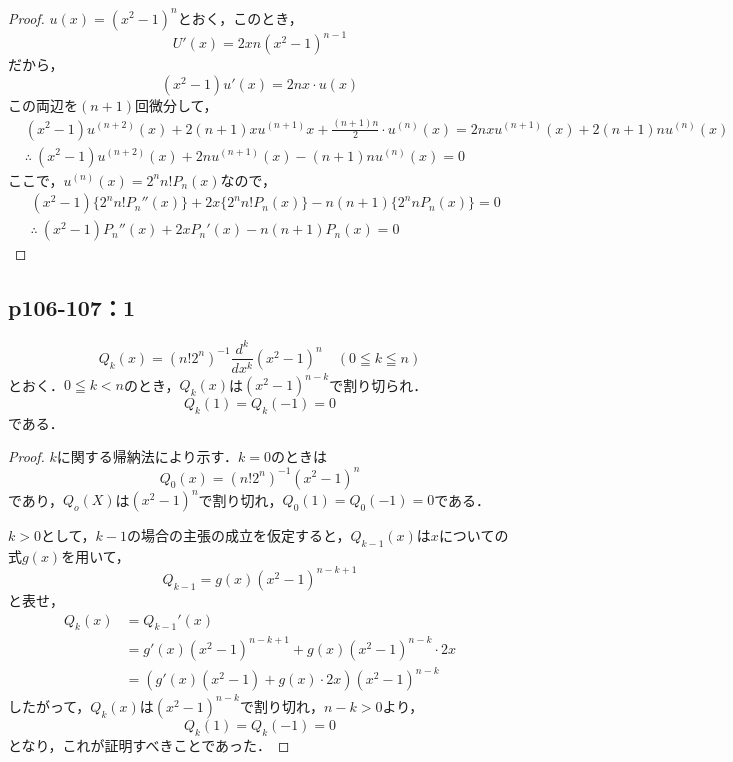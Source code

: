\documentclass[a4paper,10pt,fleqn]{ltjsarticle}
\begin{document}
\begin{tleftbar}
    \begin{proof}
    $u(x)= (x^2-1)^n$とおく，このとき，
    \[
     U'(x)= 2x n(x^2-1)^{n-1}
    \]
    だから，
    \[
        (x^2-1) u'(x)=2nx \cdot u(x)
    \]
    この両辺を$(n+1)$回微分して，
    \begin{align*}
       & (x^2-1)u^{(n+2)}(x)+2(n+1)x u^{(n+1)} x + \frac{(n+1)n}{2} \cdot u^{(n)} (x) = 2nx u^{(n+1)}(x) + 2(n+1) n u^{(n)}(x) \\
       & \therefore ~(x^2-1)u^{(n+2)}(x) + 2n u^{(n+1)}(x)-(n+1)n u^{(n)}(x)=0
    \end{align*}
    ここで，$ u^{(n)} (x)= 2^n n! P_n (x)$なので，
    \begin{align*} 
        & (x^2 -1) \{ 2^n n! P_n ''(x) \} +2x \{ 2^n n! P_n (x) \} -n(n+1) \{ 2^n n P_n(x) \} =0 \\
      &   \therefore ~ (x^2-1) P_n ''(x)+2x P_n '(x) -n(n+1) P_n (x)=0
    \end{align*}
\end{proof}
\end{tleftbar}

\newpage 
\subsection*{p106-107：1}


    \[
        Q_k (x)= (n! 2^n)^{-1} \frac{d^k}{dx^k} (x^2-1)^n \quad (0 \leqq k \leqq n)
    \]
とおく．$0 \leqq k <n$のとき，$Q_k (x)$は$(x^2-1)^{n-k}$で割り切られ．
\[
    Q_k (1)= Q_k(-1)=0
\]
である．

\begin{proof}
    $k$に関する帰納法により示す．$k=0$のときは
    \[
        Q_0(x)= (n! 2^n)^{-1} (x^2-1)^n
    \]
    であり，$Q_o(X)$は$(x^2-1)^n$で割り切れ，$Q_0(1)=Q_0(-1)=0$である．

    $k>0$として，$k-1$の場合の主張の成立を仮定すると，$Q_{k-1}(x)$は$x$についての式$g(x)$を用いて，
    \[
        Q_{k-1} = g(x)(x^2-1)^{n-k+1}
    \]
    と表せ，
    \begin{align*}
        Q_k (x) & =Q_{k-1}' (x) \\
        &= g'(x)(x^2-1)^{n-k+1} + g(x) (x^2-1)^{n-k} \cdot 2x \\
        &=(g'(x)(x^2-1)+g(x) \cdot 2x) (x^2-1)^{n-k}
    \end{align*}
    したがって，$Q_k(x)$は$(x^2-1)^{n-k}$で割り切れ，$n-k >0$より，
    \[
        Q_k (1)= Q_k(-1)=0
    \]
    となり，これが証明すべきことであった．
\end{proof}
\end{document}
